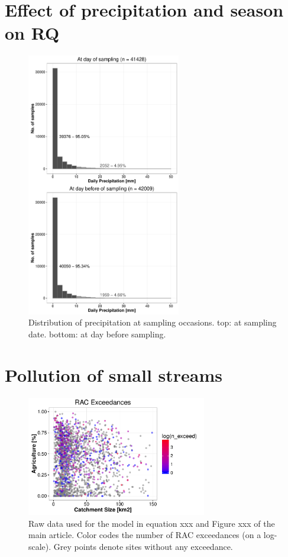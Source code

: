 \documentclass[pdftex,a4paper]{scrreprt}
\begin{document}
\chapter{Effect of precipitation and season on RQ}
\begin{figure}[h]
	\centering
	\includegraphics[width = 0.6\textwidth]{precip}
	\caption{Distribution of precipitation at sampling occasions. top: at sampling date. bottom: at day before sampling.}
	\label{fig:precip}
\end{figure}







\chapter{Pollution of small streams}
\begin{figure}[h]
	\centering
	\includegraphics[width = 0.7\textwidth]{ezgagrirac}
	\caption{Raw data used for the model in equation xxx and Figure xxx of the main article. Color codes the number of RAC exceedances (on a log-scale). Grey points denote sites without any exceedance.}
	\label{fig:ezgagrirac}
\end{figure}



\end{document}
